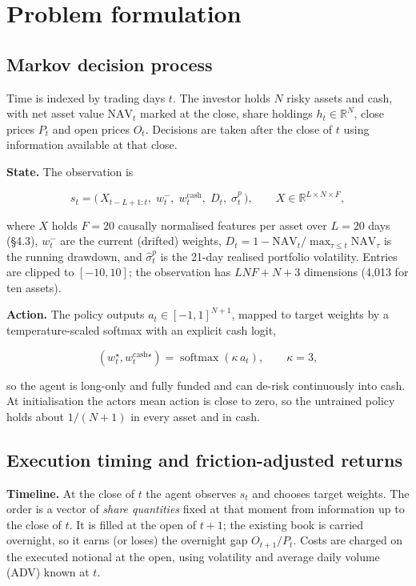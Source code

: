 \documentclass[11pt]{article}
\begin{document}
\section{Problem formulation}\label{s3}

\subsection{Markov decision process}\label{markov-decision-process}

Time is indexed by trading days \(t\). The investor holds \(N\) risky assets and cash, with net asset value \(\mathrm{NAV}_t\) marked at the close, share holdings \(h_t\in\mathbb R^N\), close prices \(P_t\) and open prices \(O_t\). Decisions are taken after the close of \(t\) using information available at that close.

\textbf{State.} The observation is

\[ s_t = \big(\,X_{t-L+1:t},\; w^-_t,\; w^{\text{cash}}_t,\; D_t,\; \hat\sigma^{p}_t\,\big), \qquad X\in\mathbb R^{L\times N\times F}, \]

where \(X\) holds \(F=20\) causally normalised features per asset over \(L=20\) days (\S{}4.3), \(w^-_t\) are the current (drifted) weights, \(D_t = 1-\mathrm{NAV}_t/\max_{\tau\le t}\mathrm{NAV}_\tau\) is the running drawdown, and \(\hat\sigma^p_t\) is the 21-day realised portfolio volatility. Entries are clipped to \([-10,10]\); the observation has \(LNF + N + 3\) dimensions (4,013 for ten assets).

\textbf{Action.} The policy outputs \(a_t\in[-1,1]^{N+1}\), mapped to target weights by a temperature-scaled softmax with an explicit cash logit,

\[ (w^\star_t, w^{\text{cash}\star}_t) = \operatorname{softmax}(\kappa\, a_t),\qquad \kappa = 3, \]

so the agent is long-only and fully funded and can de-risk continuously into cash. At initialisation the actor\textquotesingle s mean action is close to zero, so the untrained policy holds about \(1/(N+1)\) in every asset and in cash.

\subsection{Execution timing and friction-adjusted returns}\label{execution-timing-and-friction-adjusted-returns}

\textbf{Timeline.} At the close of \(t\) the agent observes \(s_t\) and chooses target weights. The order is a vector of \emph{share quantities} fixed at that moment from information up to the close of \(t\). It is filled at the open of \(t+1\); the existing book is carried overnight, so it earns (or loses) the overnight gap \(O_{t+1}/P_t\). Costs are charged on the executed notional at the open, using volatility and average daily volume (ADV) known at \(t\).
\end{document}
